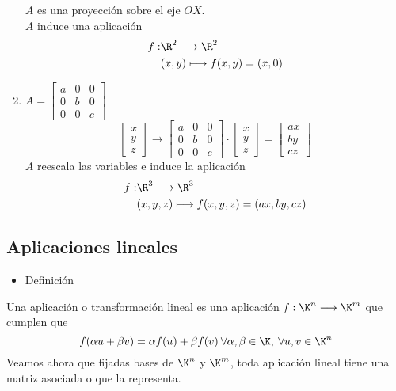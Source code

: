 \begin{enumerate}[label=\color{lightblue}\arabic*)]
\begin{center}
\begin{tikzpicture}
		\end{tikzpicture}
	\end{center}
	$A$ es una proyección sobre el eje $OX$.\\
	$A$ induce una aplicación \[ \begin{aligned}
		f:&\R^2\longmapsto\R^2\\
		&(x,y)\longmapsto f(x,y)=(x,0)
	\end{aligned} \]
	\item $A=\begin{bmatrix}
		a & 0 & 0\\
		0 & b & 0\\
		0 & 0 & c
	\end{bmatrix}$ \[ \begin{bmatrix}
		x\\
		y\\
		z
	\end{bmatrix}\longrightarrow\begin{bmatrix}
		a & 0 & 0\\
		0 & b & 0\\
		0 & 0 & c
	\end{bmatrix}\cdot\begin{bmatrix}
		x\\
		y\\
		z
	\end{bmatrix}=\begin{bmatrix}
		ax\\
		by\\
		cz
	\end{bmatrix} \]
	$A$ reescala las variables e induce la aplicación \[ \begin{aligned}
		f:&\R^3\longrightarrow\R^3\\
		&(x,y,z)\longmapsto f(x,y,z)=(ax,by,cz)
	\end{aligned} \]
\end{enumerate}
\subsection{Aplicaciones lineales}
\begin{itemize}[label=\color{red}\textbullet, leftmargin=*]
	\item \color{lightblue}Definición
\end{itemize}
Una aplicación o transformación lineal es una aplicación $f:\K^n\longrightarrow\K^m$ que cumplen que \[ f(\alpha u+\beta v)=\alpha f(u)+\beta f(v)\:\forall\alpha,\beta\in\K,\:\forall u,v\in\K^n \]
Veamos ahora que fijadas bases de $\K^n$ y $\K^m$, toda aplicación lineal tiene una matriz asociada o que la representa.

